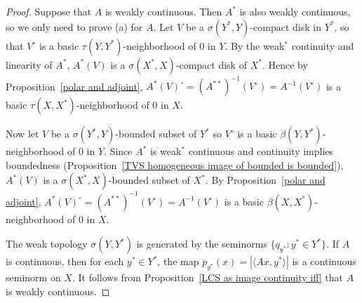 \begin{proof}
Suppose that $A$ is weakly continuous. Then $A^*$ is also weakly continuous, so we only need to prove (a) for $A$. Let $V$ be a $\sigma(Y^*,Y)$-compact disk in $Y^*$, so that $V^\circ$ is a basic $\tau(Y,Y^*)$-neighborhood of $0$ in $Y$. By the weak$^*$ continuity and linearity of $A^*$, $A^*(V)$ is a $\sigma(X^*,X)$-compact disk of $X^*$. Hence by Proposition~\ref{polar and adjoint}, $A^*(V)^\circ=(A^{**})^{-1}(V^\circ)=A^{-1}(V^\circ)$ is a basic $\tau(X,X^*)$-neighborhood of $0$ in $X$.\par
Now let $V$ be a $\sigma(Y^*,Y)$-bounded subset of $Y^*$ so $V^\circ$ is a basic $\beta(Y,Y^*)$-neighborhood of $0$ in $Y$. Since $A^*$ is weak$^*$ continuous and continuity implies boundedness (Proposition~\ref{TVS homogeneous image of bounded is bounded}), $A^*(V)$ is a $\sigma(X^*,X)$-bounded subset of $X^*$. By Proposition~\ref{polar and adjoint}, $A^*(V)^\circ=(A^{**})^{-1}(V^\circ)=A^{-1}(V^\circ)$ is a basic $\beta(X,X^*)$-neighborhood of $0$ in $X$.\par
The weak topology $\sigma(Y,Y^*)$ is generated by the seminorms $\{q_{y^*}:y^*\in Y^*\}$. If $A$ is continuous, then for each $y^*\in Y^*$, the map $p_{y^*}(x)=|\langle Ax,y^*\rangle|$ is a continuous seminorm on $X$. It follows from Proposition~\ref{LCS as image continuity iff} that $A$ is weakly continuous.
\end{proof}
